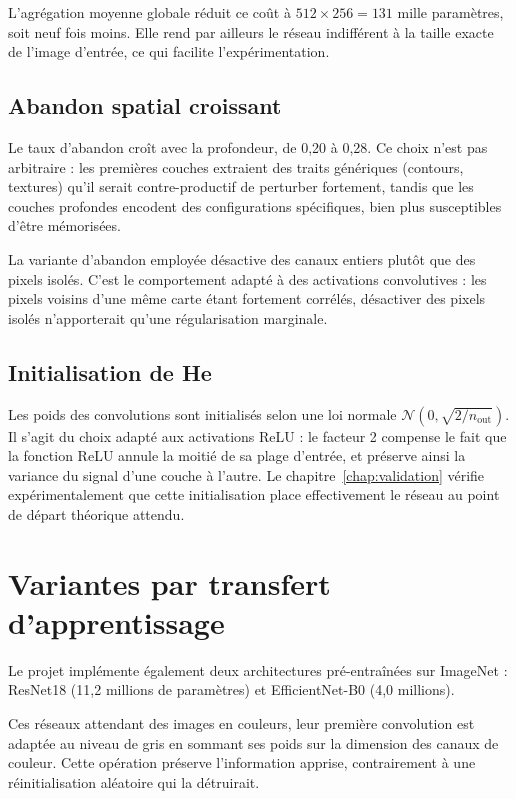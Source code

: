 \documentclass[a4paper,12pt]{report}
\begin{document}
L'agrégation moyenne globale réduit ce coût à $512 \times 256 = 131$ mille
paramètres, soit neuf fois moins. Elle rend par ailleurs le réseau indifférent à
la taille exacte de l'image d'entrée, ce qui facilite l'expérimentation.

\subsection{Abandon spatial croissant}

Le taux d'abandon croît avec la profondeur, de 0{,}20 à 0{,}28. Ce choix
n'est pas arbitraire : les premières couches extraient des traits génériques
(contours, textures) qu'il serait contre-productif de perturber fortement,
tandis que les couches profondes encodent des configurations spécifiques, bien
plus susceptibles d'être mémorisées.

La variante d'abandon employée désactive des canaux entiers plutôt que des
pixels isolés. C'est le comportement adapté à des activations convolutives :
les pixels voisins d'une même carte étant fortement corrélés, désactiver des
pixels isolés n'apporterait qu'une régularisation marginale.

\subsection{Initialisation de He}
\label{sec:init}

Les poids des convolutions sont initialisés selon une loi normale
$\mathcal{N}(0, \sqrt{2/n_{\text{out}}})$. Il s'agit du choix adapté aux
activations ReLU : le facteur 2 compense le fait que la fonction ReLU annule la
moitié de sa plage d'entrée, et préserve ainsi la variance du signal d'une
couche à l'autre. Le chapitre~\ref{chap:validation} vérifie expérimentalement
que cette initialisation place effectivement le réseau au point de départ
théorique attendu.

\section{Variantes par transfert d'apprentissage}

Le projet implémente également deux architectures pré-entraînées sur ImageNet :
ResNet18 (11{,}2 millions de paramètres) et EfficientNet-B0 (4{,}0 millions).

Ces réseaux attendant des images en couleurs, leur première convolution est
adaptée au niveau de gris en sommant ses poids sur la dimension des canaux de
couleur. Cette opération préserve l'information apprise, contrairement à une
réinitialisation aléatoire qui la détruirait.
\end{document}
